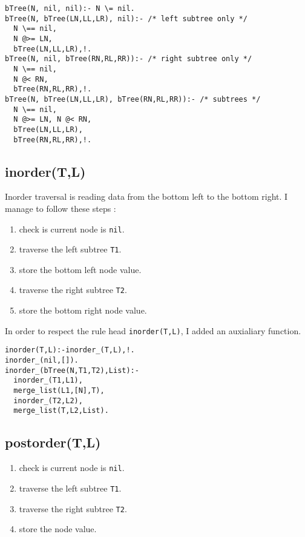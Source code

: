\documentclass{article}
\begin{document}
    \begin{verbatim}
bTree(N, nil, nil):- N \= nil.
bTree(N, bTree(LN,LL,LR), nil):- /* left subtree only */
  N \== nil,
  N @>= LN,
  bTree(LN,LL,LR),!.
bTree(N, nil, bTree(RN,RL,RR)):- /* right subtree only */
  N \== nil,
  N @< RN,
  bTree(RN,RL,RR),!.
bTree(N, bTree(LN,LL,LR), bTree(RN,RL,RR)):- /* subtrees */
  N \== nil,
  N @>= LN, N @< RN,
  bTree(LN,LL,LR),
  bTree(RN,RL,RR),!.
    \end{verbatim}

  \subsection*{inorder(T,L)}
    Inorder traversal is reading data from the bottom left to the bottom right.
    I manage to follow these steps :
    \begin{enumerate}
      \item check is current node is \texttt{nil}.
      \item traverse the left subtree \texttt{T1}.
      \item store the bottom left node value.
      \item traverse the right subtree \texttt{T2}.
      \item store the bottom right node value.
    \end{enumerate}
    In order to respect the rule head \texttt{inorder(T,L)}, I added an auxialiary function.
    \begin{verbatim}
inorder(T,L):-inorder_(T,L),!.
inorder_(nil,[]).
inorder_(bTree(N,T1,T2),List):-
  inorder_(T1,L1),
  merge_list(L1,[N],T),
  inorder_(T2,L2),
  merge_list(T,L2,List).
    \end{verbatim}

  \subsection*{postorder(T,L)}
    \begin{enumerate}
      \item check is current node is \texttt{nil}.
      \item traverse the left subtree \texttt{T1}.
      \item traverse the right subtree \texttt{T2}.
      \item store the node value.
    \end{enumerate}
\end{document}
